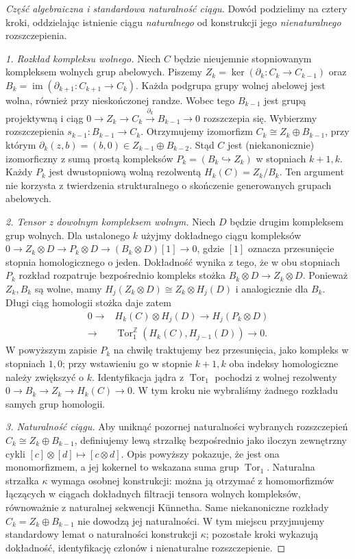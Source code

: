 \documentclass[11pt,a4paper,oneside]{report}
\newcommand{\Z}{\mathbb{Z}}
\theoremstyle{plain}
\theoremstyle{definition}
\theoremstyle{remark}
\begin{document}
\begin{proof}[Część algebraiczna i standardowa naturalność ciągu]
Dowód podzielimy na cztery kroki, oddzielając istnienie ciągu
\emph{naturalnego} od konstrukcji jego \emph{nienaturalnego} rozszczepienia.

\emph{1. Rozkład kompleksu wolnego.}
Niech $C$ będzie nieujemnie stopniowanym kompleksem wolnych grup
abelowych. Piszemy $Z_k=\ker(\partial_k:C_k\to C_{k-1})$ oraz
$B_k=\operatorname{im}(\partial_{k+1}:C_{k+1}\to C_k)$.
Każda podgrupa grupy wolnej abelowej jest wolna, również
przy nieskończonej randze. Wobec tego $B_{k-1}$ jest grupą
projektywną i ciąg
$0\to Z_k\to C_k\xrightarrow{\partial_k}B_{k-1}\to0$
rozszczepia się. Wybierzmy rozszczepienia
$s_{k-1}:B_{k-1}\to C_k$. Otrzymujemy izomorfizm
$C_k\cong Z_k\oplus B_{k-1}$, przy którym
$\partial_k(z,b)=(b,0)\in Z_{k-1}\oplus B_{k-2}$.
Stąd $C$ jest (niekanonicznie) izomorficzny z sumą prostą
kompleksów $P_k=(B_k\hookrightarrow Z_k)$ w stopniach
$k+1,k$. Każdy $P_k$ jest dwustopniową wolną rezolwentą
$H_k(C)=Z_k/B_k$. Ten argument nie korzysta z twierdzenia
strukturalnego o skończenie generowanych grupach abelowych.

\emph{2. Tensor z dowolnym kompleksem wolnym.}
Niech $D$ będzie drugim kompleksem grup wolnych.
Dla ustalonego $k$ użyjmy dokładnego ciągu kompleksów
$0\to Z_k\otimes D\to P_k\otimes D\to (B_k\otimes D)[1]\to0$,
gdzie $[1]$ oznacza przesunięcie stopnia homologicznego o jeden.
Dokładność wynika z tego, że w obu stopniach $P_k$
rozkład rozpatruje bezpośrednio kompleks stożka
$B_k\otimes D\to Z_k\otimes D$.
Ponieważ $Z_k,B_k$ są wolne, mamy
$H_j(Z_k\otimes D)\cong Z_k\otimes H_j(D)$ i analogicznie
dla $B_k$. Długi ciąg homologii stożka daje zatem
\[
\begin{split}
0\to&H_k(C)\otimes H_j(D)\longrightarrow
H_j(P_k\otimes D)\\
\longrightarrow&\operatorname{Tor}^{\Z}_1(H_k(C),H_{j-1}(D))\to0.
\end{split}
\]
W powyższym zapisie $P_k$ na chwilę traktujemy bez przesunięcia,
jako kompleks w stopniach $1,0$; przy wstawieniu go w stopnie
$k+1,k$ oba indeksy homologiczne należy zwiększyć o $k$.
Identyfikacja jądra z $\operatorname{Tor}_1$ pochodzi z wolnej
rezolwenty $0\to B_k\to Z_k\to H_k(C)\to0$.
W tym kroku nie wybraliśmy żadnego rozkładu samych grup homologii.

\emph{3. Naturalność ciągu.}
Aby uniknąć pozornej naturalności wybranych rozszczepień
$C_k\cong Z_k\oplus B_{k-1}$, definiujemy lewą strzałkę
bezpośrednio jako iloczyn zewnętrzny cykli
$[c]\otimes[d]\mapsto[c\otimes d]$.
Opis powyższy pokazuje, że jest ona monomorfizmem,
a jej kokernel to wskazana suma grup $\operatorname{Tor}_1$.
Naturalna strzałka $\kappa$ wymaga osobnej konstrukcji:
można ją otrzymać z homomorfizmów łączących w ciągach
dokładnych filtracji tensora wolnych kompleksów, równoważnie
z naturalnej sekwencji Künnetha. Same niekanoniczne rozkłady
$C_k=Z_k\oplus B_{k-1}$ nie dowodzą jej naturalności.
W tym miejscu przyjmujemy standardowy lemat o naturalności
konstrukcji $\kappa$; pozostałe kroki wykazują dokładność,
identyfikację członów i nienaturalne rozszczepienie.


\end{proof}
\end{document}
